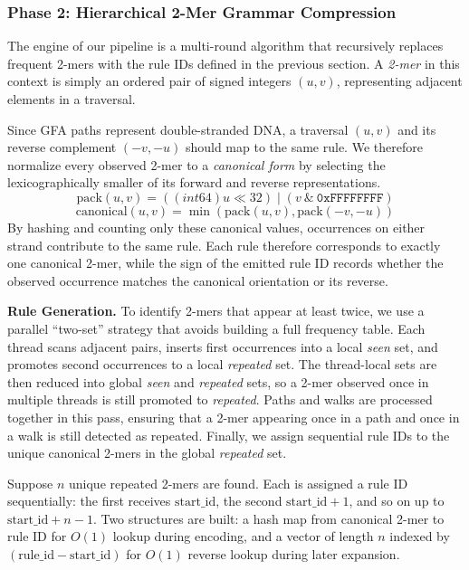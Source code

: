 \subsubsection{Phase 2: Hierarchical 2-Mer Grammar Compression}

The engine of our pipeline is a multi-round algorithm that recursively replaces frequent 2-mers with the rule IDs defined in the previous section. A \emph{2-mer} in this context is simply an ordered pair of signed integers $(u, v)$, representing adjacent elements in a traversal.

Since GFA paths represent double-stranded DNA, a traversal $(u, v)$ and its reverse complement $(-v, -u)$ should map to the same rule. We therefore normalize every observed 2-mer to a \emph{canonical form} by selecting the lexicographically smaller of its forward and reverse representations.
\begin{equation}
  \text{pack}(u, v) = ((int64)u \ll 32) \mid (v \ \& \ \texttt{0xFFFFFFFF})
\end{equation}
\begin{equation}
  \text{canonical}(u, v) = \min\left(\text{pack}(u, v), \text{pack}(-v, -u)\right)
\end{equation}
By hashing and counting only these canonical values, occurrences on either strand contribute to the same rule. Each rule therefore corresponds to exactly one canonical 2-mer, while the sign of the emitted rule ID records whether the observed occurrence matches the canonical orientation or its reverse.

\noindent \textbf{Rule Generation.} To identify 2-mers that appear at least twice, we use a parallel ``two-set'' strategy that avoids building a full frequency table. Each thread scans adjacent pairs, inserts first occurrences into a local \emph{seen} set, and promotes second occurrences to a local \emph{repeated} set. The thread-local sets are then reduced into global \emph{seen} and \emph{repeated} sets, so a 2-mer observed once in multiple threads is still promoted to \emph{repeated}. Paths and walks are processed together in this pass, ensuring that a 2-mer appearing once in a path and once in a walk is still detected as repeated. Finally, we assign sequential rule IDs to the unique canonical 2-mers in the global \emph{repeated} set.

Suppose $n$ unique repeated 2-mers are found. Each is assigned a rule ID sequentially: the first receives $\text{start\_id}$, the second $\text{start\_id} + 1$, and so on up to $\text{start\_id} + n - 1$. Two structures are built: a hash map from canonical 2-mer to rule ID for $O(1)$ lookup during encoding, and a vector of length $n$ indexed by $(\text{rule\_id} - \text{start\_id})$ for $O(1)$ reverse lookup during later expansion.

